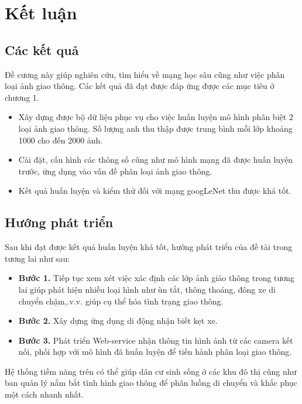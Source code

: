 \chapter{Kết luận}

\section{Các kết quả }
Đề cương này giúp nghiên cứu, tìm hiểu về mạng học sâu cũng như việc phân loại ảnh giao thông. Các kết quả đã đạt được đáp ứng được các mục tiêu ở chương 1.
	\begin{itemize}
		\item Xây dựng được bộ dữ liệu phục vụ cho việc huấn luyện mô hình phân biệt 2 loại ảnh giao thông. Số lượng anh thu thập được trung bình mỗi lớp khoảng 1000 cho đến 2000 ảnh.
		\item Cài đặt, cấu hình các thông số cũng như mô hình mạng đã được huấn luyện trước, ứng dụng vào vấn đề phân loại ảnh giao thông.
		\item Kết quả huấn luyện và kiểm thử đối với mạng googLeNet thu được khá tốt.
	
	\end{itemize}
\section{Hướng phát triển}
Sau khi đạt được kết quả huấn luyện khá tốt, hướng phát triển của đề tài trong tương lai như sau:
\begin{itemize}
	\item \textbf{Bước 1.} Tiếp tục xem xét việc xác định các lớp ảnh giảo thông trong tương lai giúp phát hiện nhiều loại hình như ùn tắt, thông thoáng, đông xe di chuyển chậm,.v.v. giúp cụ thể hóa tình trạng giao thông.
	\item \textbf{Bước 2.} Xây dựng ứng dụng di động nhận biết kẹt xe.
	\item \textbf{Bước 3.} Phát triển Web-service nhận thông tin hình ảnh từ các camera kết nối, phối hợp với mô hình đã huấn luyện để tiến hành phân loại giao thông.
\end{itemize}
Hệ thống tiềm năng trên có thể giúp dân cư sinh sống ở các khu đô thị cũng như ban quản lý nắm bắt tình hình giao thông để phân luồng di chuyển và khắc phục một cách nhanh nhất.